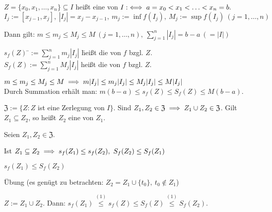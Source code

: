 \documentclass[a4paper,twoside,DIV15,BCOR12mm]{scrbook}
\begin{document}
\def\Z{\ensuremath{\mathfrak{Z}}}

\begin{definition}
$Z = \{x_0,x_1,\ldots,x_n\} \subseteq I$ heißt eine  von $I :\iff a = x_0 < x_1 < \ldots < x_n = b.$\\
$I_j := [x_{j-1},x_j],\ |I_j| = x_j-x_{j-1},\ m_j := \inf f(I_j),\ M_j := \sup f(I_j)\ (j = 1,\ldots,n)$

Dann gilt: $m \le m_j \le M_j \le M\ (j = 1,\ldots,n),\ \sum_{j=1}^{n}{|I_j|} = b-a\ (=|I|)$
\begin{tabbing}
$s_f(Z) $ \=$:= \sum_{j=1}^{n}{m_j |I_j|}$ \=heißt die  von $f$ bzgl. $Z$.\\
$S_f(Z) $\>$:= \sum_{j=1}^{n}{M_j |I_j|}$ \>heißt die  von $f$ bzgl. $Z$.
\end{tabbing}

$m \le m_j \le M_j \le M \implies m|I_j| \le m_j|I_j| \le M_j|I_j| \le M|I_j|$\\
Durch Summation erhält man: $m(b-a) \le s_f(Z) \le S_f(Z) \le M(b-a)$.

$\Z := \{Z: Z$ ist eine Zerlegung von $I\}.$ Sind $Z_1,Z_2 \in \Z \folgt Z_1 \cup Z_2 \in \Z$. Gilt $Z_1 \subseteq Z_2$, so heißt $Z_2$ eine  von $Z_1$.
\end{definition}

\begin{satz}
Seien $Z_1,Z_2 \in \Z$.
\begin{liste}
\item Ist $Z_1 \subseteq Z_2 \implies s_f(Z_1) \le s_f(Z_2),\ S_f(Z_2) \le S_f(Z_1)$
\item $s_f(Z_1) \le S_f(Z_2)$
\end{liste}
\end{satz}

\begin{beweise}
\item Übung (es genügt zu betrachten: $Z_2 = Z_1 \cup \{t_0\},\ t_0 \notin Z_1$)
\item $Z := Z_1 \cup Z_2$. Dann: $s_f(Z_1) \overset{(1)}{\le} s_f(Z) \le S_f(Z) \overset{(1)}{\le} S_f(Z_2).$
\end{beweise}

\def\dx{\text{d}x}
\def\dt{\text{d}t}
\def\uint{\declareslashed{}{\text{-}}{0}{-.7}{\int} \ensuremath{\slashed{\int}}}
\def\oint{\declareslashed{}{\text{-}}{.15}{.7}{\int} \ensuremath{\slashed{\int}}}
\end{document}
